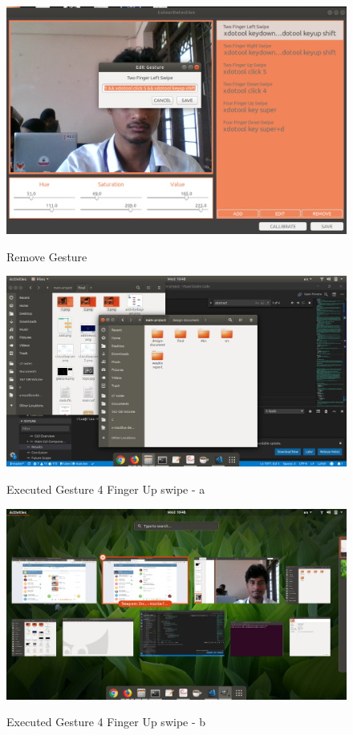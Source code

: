 \documentclass[11pt]{report}
\begin{document}
    \begin{figure}[H]
            \includegraphics[width=14cm]{3.png}
            \label{Remove Gesture}
            \caption{Remove Gesture}
            \end{figure}

    \begin{figure}[H]
                \includegraphics[width=14cm]{4.png}
                \label{Executed Gesture 4 Finger Up swipe - a}
                \caption{Executed Gesture 4 Finger Up swipe - a}

                \end{figure}
    \begin{figure}[H]
                    \includegraphics[width=14cm]{5.png}
                    \label{Executed Gesture 4 Finger Up swipe - b}
                    \caption{Executed Gesture 4 Finger Up swipe - b}
                    \end{figure}
\end{document}

